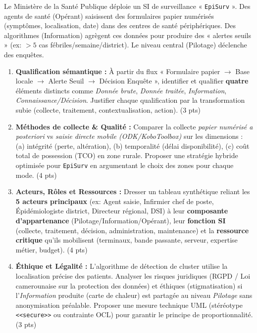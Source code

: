 \documentclass[11pt]{article}
\begin{document}
\begin{exercice}
Le Ministère de la Santé Publique déploie un SI de surveillance « \texttt{EpiSurv} ». Des agents de santé (Opérant) saisissent des formulaires papier numérisés (symptômes, localisation, date) dans des centres de santé périphériques. Des algorithmes (Information) agrègent ces données pour produire des « alertes seuils » (ex: $>5$ cas fébriles/semaine/district). Le niveau central (Pilotage) déclenche des enquêtes.
\begin{enumerate}
    \item \textbf{Qualification sémantique :} À partir du flux « Formulaire papier $\to$ Base locale $\to$ Alerte Seuil $\to$ Décision Enquête », identifier et qualifier \textbf{quatre} éléments distincts comme \textit{Donnée brute}, \textit{Donnée traitée}, \textit{Information}, \textit{Connaissance/Décision}. Justifier chaque qualification par la transformation subie (collecte, traitement, contextualisation, action). (3 pts)
    \item \textbf{Méthodes de collecte \& Qualité :} Comparer la collecte \textit{papier numérisé a posteriori} vs \textit{saisie directe mobile (ODK/KoboToolbox)} sur les dimensions : (a) intégrité (perte, altération), (b) temporalité (délai disponibilité), (c) coût total de possession (TCO) en zone rurale. Proposer une stratégie hybride optimisée pour \texttt{EpiSurv} en argumentant le choix des zones pour chaque mode. (4 pts)
    \item \textbf{Acteurs, Rôles et Ressources :} Dresser un tableau synthétique reliant les \textbf{5 acteurs principaux} (ex: Agent saisie, Infirmier chef de poste, Épidémiologiste district, Directeur régional, DSI) à leur \textbf{composante d'appartenance} (Pilotage/Information/Opérant), leur \textbf{fonction SI} (collecte, traitement, décision, administration, maintenance) et la \textbf{ressource critique} qu'ils mobilisent (terminaux, bande passante, serveur, expertise métier, budget). (4 pts)
    \item \textbf{Éthique et Légalité :} L'algorithme de détection de cluster utilise la localisation précise des patients. Analyser les risques juridiques (RGPD / Loi camerounaise sur la protection des données) et éthiques (stigmatisation) si l'\textit{Information} produite (carte de chaleur) est partagée au niveau \textit{Pilotage} sans anonymisation préalable. Proposer une mesure technique UML (stéréotype \texttt{<<secure>>} ou contrainte OCL) pour garantir le principe de proportionnalité. (3 pts)
\end{enumerate}
\end{exercice}
\end{document}
